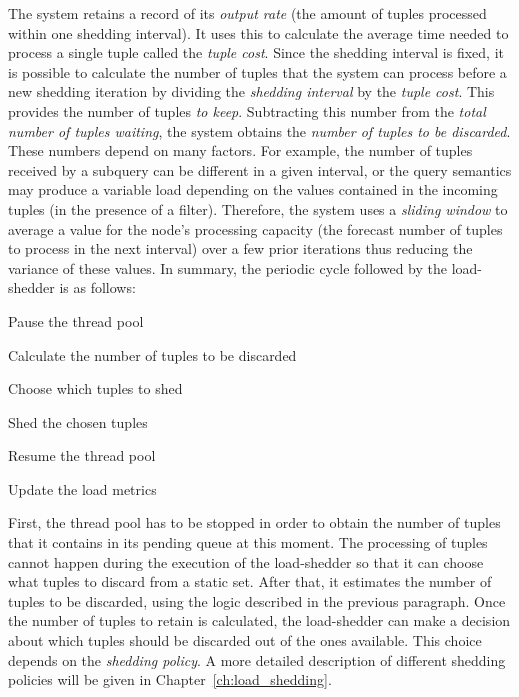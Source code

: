The system retains a record of its \emph{output rate} (\ie the amount of tuples processed within one
shedding interval). It uses this to calculate the average time needed to process a single tuple called
the \emph{tuple cost}.
Since the shedding interval is
fixed, it is possible to calculate the number of tuples that the system can process before
a new shedding iteration by dividing the \emph{shedding interval} by the \emph{tuple cost}. This
provides the number of tuples \emph{to keep}. Subtracting this number from the \emph{total number of
tuples waiting}, the system obtains the \emph{number of tuples to be discarded}.\\
These numbers depend on many factors. For example, the number of tuples received by a subquery
can be different in a given interval, or the query semantics may produce a variable load
depending on the values contained in the incoming tuples (\ie in the presence of a filter). 
Therefore, the system uses a \emph{sliding window} to average a value for the node's processing capacity
(\ie the forecast number of tuples to process in the next interval) over a few prior iterations thus
reducing the variance of these values. In summary, the periodic cycle followed by the load-shedder is as
follows:
\vspace{-10pt}
\begin{myenumerate}
  \item Pause the thread pool
  \item Calculate the number of tuples to be discarded
  \item Choose which tuples to shed
  \item Shed the chosen tuples
  \item Resume the thread pool
  \item Update the load metrics 
\end{myenumerate}
\vspace{-10pt}
First, the thread pool has to be stopped in order to obtain the number of tuples that it contains in its
pending queue at this moment. The processing of tuples cannot happen during the execution of the
load-shedder so that it can choose what tuples to discard from a static set. 
After that, it estimates the number of tuples to be discarded, using the logic described in the previous
paragraph.
Once the number of tuples to retain is calculated, the load-shedder can make a decision about
which tuples should be discarded out of the ones available. This choice depends on the \emph{shedding
policy}. A more detailed description of different shedding policies will be given in Chapter~\ref{ch:load_shedding}. 

